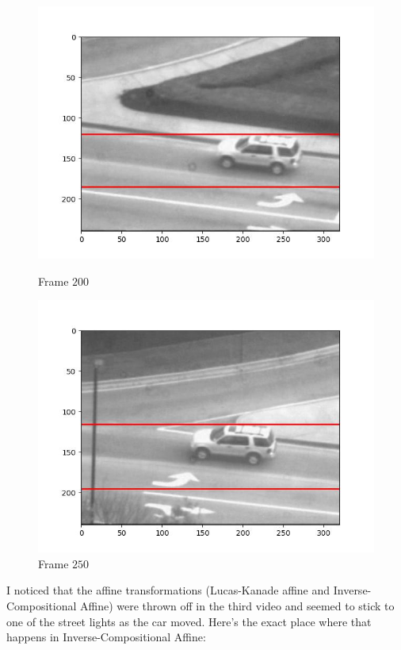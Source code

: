 \begin{figure}[H]
\begin{minipage}{.49\textwidth}
    \includegraphics[width=\textwidth]{./figures/ic_affine/car2/frame000200.jpg}
    \caption{Frame $200$}
  \end{minipage}
  \hfill
  \begin{minipage}{.49\textwidth}
    \centering
    \includegraphics[width=\textwidth]{./figures/ic_affine/car2/frame000250.jpg}
    \caption{Frame $250$}
  \end{minipage}
\end{figure}

\newpage
I noticed that the affine transformations (Lucas-Kanade affine and Inverse-Compositional Affine)
were thrown off in the third video and seemed to stick to one of the street lights
as the car moved.
Here's the exact place where that happens in Inverse-Compositional Affine:

